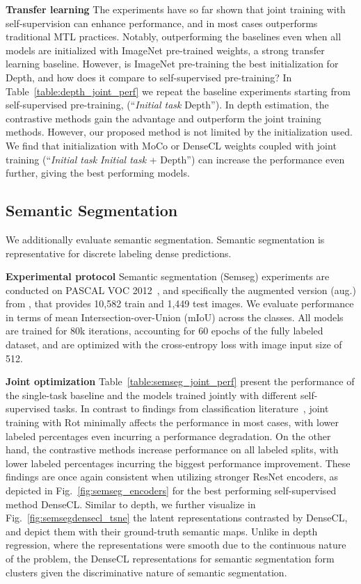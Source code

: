 \documentclass[10pt,twocolumn,letterpaper]{article}
\newcommand{\parsection}[1]{\vspace{1mm}\noindent\textbf{#1 }}
\begin{document}
\parsection{Transfer learning}
The experiments have so far shown that joint training with self-supervision can enhance performance, and in most cases outperforms traditional MTL practices.
Notably, outperforming the baselines even when all models are initialized with ImageNet pre-trained weights, a strong transfer learning baseline.
However, is ImageNet pre-training the best initialization for Depth, and how does it compare to self-supervised pre-training?
In Table~\ref{table:depth_joint_perf} we repeat the baseline experiments starting from self-supervised pre-training, (``\emph{Initial task}  Depth'').
In depth estimation, the contrastive methods gain the advantage and outperform the joint training methods.
However, our proposed method is not limited by the initialization used.
We find that initialization with MoCo or DenseCL weights coupled with joint training (``\emph{Initial task}  \emph{Initial task} + Depth'') can increase the performance even further, giving the best performing models.



\subsection{Semantic Segmentation}
\label{sec:semseg_exp}

We additionally evaluate semantic segmentation. 
Semantic segmentation is representative for discrete labeling dense predictions.

\parsection{Experimental protocol}
Semantic segmentation (Semseg) experiments are conducted on PASCAL VOC 2012~\cite{everingham2010pascal}, and specifically the augmented version (aug.) from \cite{hariharan2011semantic}, that provides 10,582 train and 1,449 test images. 
We evaluate performance in terms of mean Intersection-over-Union (mIoU) across the classes. 
All models are trained for 80k iterations, accounting for 60 epochs of the fully labeled dataset, and are optimized with the cross-entropy loss with image input size of 512. 

\parsection{Joint optimization}
Table~\ref{table:semseg_joint_perf} present the performance of the single-task baseline and the models trained jointly with different self-supervised tasks. 
In contrast to findings from classification literature~\cite{gidaris2019boosting,zhai2019s4l}, joint training with Rot minimally affects the performance in most cases, with lower labeled percentages even incurring a performance degradation. 
On the other hand, the contrastive methods increase performance on all labeled splits, with lower labeled percentages incurring the biggest performance improvement. 
These findings are once again consistent when utilizing stronger ResNet encoders, as depicted in Fig.~\ref{fig:semseg_encoders} for the best performing self-supervised method DenseCL.
Similar to depth, we further visualize in Fig.~\ref{fig:semsegdensecl_tsne} the latent representations contrasted by DenseCL, and depict them with their ground-truth semantic maps. 
Unlike in depth regression, where the representations were smooth due to the continuous nature of the problem, the DenseCL representations for semantic segmentation form clusters given the discriminative nature of semantic segmentation.
\end{document}
